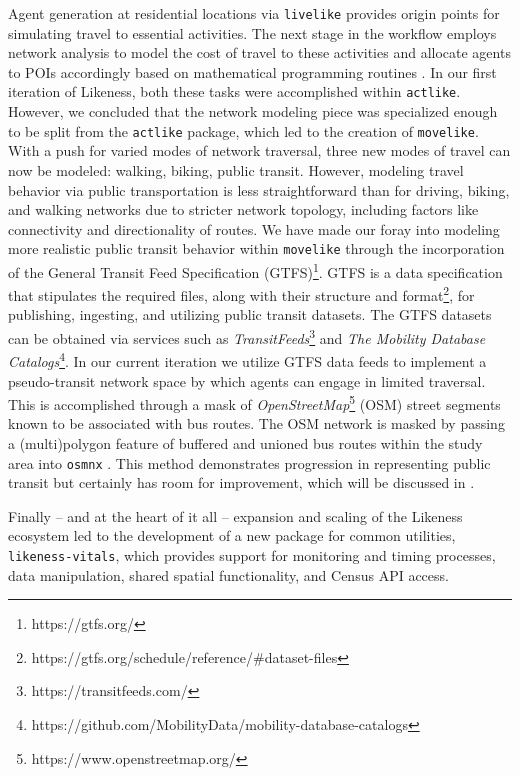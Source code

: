 

Agent generation at residential locations via \texttt{livelike} provides origin points for simulating travel to essential activities. 
The next stage in the workflow employs network analysis to model the cost of travel to these activities \cite{OpenStreetMap, osmnx_CEUS_2017, foti_generalized_2012} and allocate agents to POIs accordingly based on mathematical programming routines \cite{mitchell_pulp_2011, santos_mixed_2020, lougee_coin_2003, forrest_coinorcbc_2023}. In our first iteration of Likeness, both these tasks were accomplished within \texttt{actlike}. However, we concluded that the network modeling piece was specialized enough to be split from the \texttt{actlike} package, which led to the creation of \texttt{movelike}. With a push for varied modes of network traversal, three new modes of travel can now be modeled: walking, biking, public transit. However, modeling travel behavior via public transportation is less straightforward than for driving, biking, and walking networks due to stricter network topology, including factors like connectivity and directionality of routes. We have made our foray into modeling more realistic public transit behavior within \texttt{movelike} through the incorporation of the General Transit Feed Specification (GTFS)\footnote{https://gtfs.org/}. GTFS is a data specification that stipulates the required files, along with their structure and format\footnote{https://gtfs.org/schedule/reference/\#dataset-files}, for publishing, ingesting, and utilizing public transit datasets. The GTFS datasets can be obtained via services such as \textit{TransitFeeds}\footnote{https://transitfeeds.com/} and \textit{The Mobility Database Catalogs}\footnote{https://github.com/MobilityData/mobility-database-catalogs}. In our current iteration we utilize GTFS data feeds to implement a pseudo-transit network space by which agents can engage in limited traversal. This is accomplished through a mask of \textit{OpenStreetMap}\footnote{https://www.openstreetmap.org/} (OSM) street segments known to be associated with bus routes. The OSM network is masked by passing a (multi)polygon feature of buffered and unioned bus routes within the study area into \texttt{osmnx} \cite{osmnx_CEUS_2017}. This method demonstrates progression in representing public transit but certainly has room for improvement, which will be discussed in .

Finally -- and at the heart of it all -- expansion and scaling of the Likeness ecosystem led to the development of a new package for common utilities, \texttt{likeness-vitals}, which provides support for monitoring and timing processes, data manipulation, shared spatial functionality, and Census API access.


